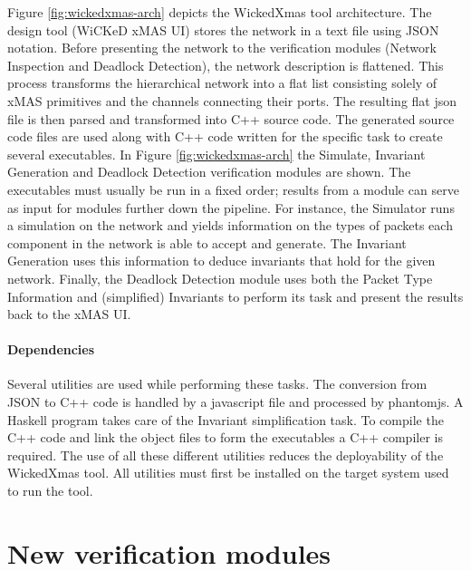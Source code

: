 \documentclass[a4paper,11pt]{article}
\begin{document}
Figure \ref{fig:wickedxmas-arch}\cite[p.~3]{13_toolxmas} depicts the WickedXmas tool architecture.
The design tool (WiCKeD xMAS UI) stores the network in a text file using JSON notation. Before
presenting the network to the verification modules (Network Inspection and Deadlock Detection),
the network description is flattened. This process transforms the hierarchical network into
a flat list consisting solely of xMAS primitives and the channels connecting their ports. The resulting
flat json file is then parsed and transformed into C++ source code. The generated source code files are
used along with C++ code written for the specific task to create several executables. In Figure
\ref{fig:wickedxmas-arch} the Simulate, Invariant Generation and Deadlock Detection verification modules
are shown. The executables must usually be run in a fixed order; results from a module can serve as input for modules further down
the pipeline. For instance, the Simulator runs a simulation on the network and yields information on the
types of packets each component in the network is able to accept and generate. The Invariant Generation
uses this information to deduce invariants that hold for the given network. Finally, the Deadlock Detection
module uses both the Packet Type Information and (simplified) Invariants to perform its task and present
the results back to the xMAS UI.

\paragraph{Dependencies}
Several utilities are used while performing these tasks. The conversion from JSON to C++ code is
handled by a javascript file and processed by phantomjs. A Haskell program takes care of the
Invariant simplification task. To compile the C++ code and link the object files to form the
executables a C++ compiler is required. The use of all these different utilities reduces the
deployability of the WickedXmas tool. All utilities must first be installed on the target system used
to run the tool.

\newpage

\section{New verification modules}
\end{document}
